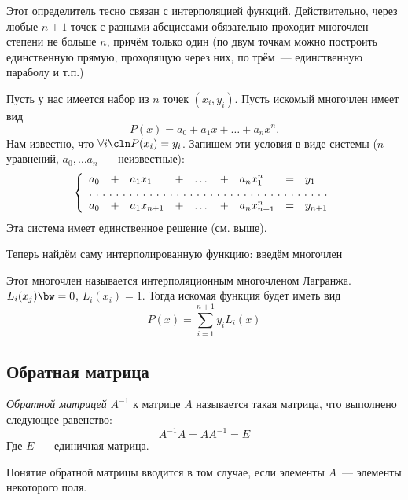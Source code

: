 Этот определитель тесно связан с интерполяцией функций. Действительно, через любые $n+1$ точек с разными абсциссами обязательно проходит многочлен степени не больше $n$, причём только один (по двум точкам можно построить единственную прямую, проходящую через них, по трём~--- единственную параболу и т.п.)

Пусть у нас имеется набор из $n$ точек $(x_i,y_i)$. Пусть искомый многочлен имеет вид $$P(x)=a_0+a_1x+\dots+a_nx^n.$$ Нам известно, что $\forall i\cln P(x_i)=y_i$. Запишем эти условия в виде системы ($n$ уравнений, $a_0,\dots a_n$~--- неизвестные):
$$
\left\{
 \begin{array}{lllllllll}
  a_0&+&a_1x_1&+&\dots&+&a_nx_1^n&=&y_1\\
  \hdotsfor[2]{9}\\
  a_0&+&a_1x_{n+1}&+&\dots&+&a_nx_{n+1}^n&=&y_{n+1}\\
 \end{array}
\right.
$$
Эта система имеет единственное решение (см. выше).

Теперь найдём саму интерполированную функцию: введём многочлен

  \begin{center}
  \end{center}

 Этот многочлен называется интерполяционным многочленом Лагранжа. $L_i(x_j)\bw=0$, $L_i(x_i)=1$. Тогда искомая функция будет иметь вид
 $$P(x)=\sum_{i=1}^{n+1}y_iL_i(x)$$

\subsection{Обратная матрица}
\label{matrixdet:reverse}

\begin{df}
	\emph{Обратной матрицей} $A^{-1}$ к матрице $A$ называется такая
	матрица, что выполнено следующее равенство:
	$$ A^{-1}A=AA^{-1}=E$$%
	Где $E$~--- единичная матрица.
\end{df}

\begin{note}
	Понятие обратной матрицы вводится в том случае, если элементы
	$A$~--- элементы некоторого поля.
\end{note}

